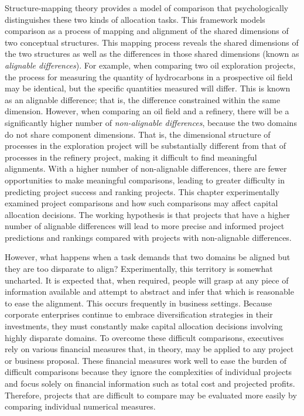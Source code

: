 \documentclass[a4paper, nobind]{templates/ociamthesis}
\theoremstyle{definition}
\theoremstyle{definition}
\theoremstyle{definition}
\theoremstyle{definition}
\theoremstyle{remark}
\begin{document}
Structure-mapping theory \autocite{gentner1997,gentner1983} provides a model of
comparison that psychologically distinguishes these two kinds of allocation
tasks. This framework models comparison as a process of mapping and alignment of
the shared dimensions of two conceptual structures. This mapping process reveals
the shared dimensions of the two structures as well as the differences in those
shared dimensions (known as \emph{alignable differences}). For example, when
comparing two oil exploration projects, the process for measuring the quantity
of hydrocarbons in a prospective oil field may be identical, but the specific
quantities measured will differ. This is known as an alignable difference; that
is, the difference constrained within the same dimension. However, when
comparing an oil field and a refinery, there will be a significantly higher
number of \emph{non-alignable differences}, because the two domains do not share
component dimensions. That is, the dimensional structure of processes in the
exploration project will be substantially different from that of processes in
the refinery project, making it difficult to find meaningful alignments. With a
higher number of non-alignable differences, there are fewer opportunities to
make meaningful comparisons, leading to greater difficulty in predicting project
success and ranking projects. This chapter experimentally examined project
comparisons and how such comparisons may affect capital allocation decisions.
The working hypothesis is that projects that have a higher number of alignable
differences will lead to more precise and informed project predictions and
rankings compared with projects with non-alignable differences.

However, what happens when a task demands that two domains be aligned but they
are too disparate to align? Experimentally, this territory is somewhat
uncharted. It is expected that, when required, people will grasp at any piece of
information available and attempt to abstract and infer that which is reasonable
to ease the alignment. This occurs frequently in business settings. Because
corporate enterprises continue to embrace diversification strategies in their
investments, they must constantly make capital allocation decisions involving
highly disparate domains. To overcome these difficult comparisons, executives
rely on various financial measures that, in theory, may be applied to any
project or business proposal. These financial measures work well to ease the
burden of difficult comparisons because they ignore the complexities of
individual projects and focus solely on financial information such as total cost
and projected profits. Therefore, projects that are difficult to compare may be
evaluated more easily by comparing individual numerical measures.
\end{document}
